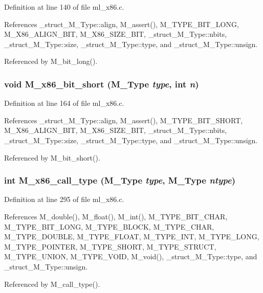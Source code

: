 Definition at line 140 of file ml\_\-x86.c.

References \_\-struct\_\-M\_\-Type::align, M\_\-assert(), M\_\-TYPE\_\-BIT\_\-LONG, M\_\-X86\_\-ALIGN\_\-BIT, M\_\-X86\_\-SIZE\_\-BIT, \_\-struct\_\-M\_\-Type::nbits, \_\-struct\_\-M\_\-Type::size, \_\-struct\_\-M\_\-Type::type, and \_\-struct\_\-M\_\-Type::unsign.

Referenced by M\_\-bit\_\-long().
\subsubsection{\setlength{\rightskip}{0pt plus 5cm}void M\_\-x86\_\-bit\_\-short (\bf{M\_\-Type} {\em type}, int {\em n})}\label{ml__x86_8c_7a8e1bb7913aaa8f58b14629c5821149}




Definition at line 164 of file ml\_\-x86.c.

References \_\-struct\_\-M\_\-Type::align, M\_\-assert(), M\_\-TYPE\_\-BIT\_\-SHORT, M\_\-X86\_\-ALIGN\_\-BIT, M\_\-X86\_\-SIZE\_\-BIT, \_\-struct\_\-M\_\-Type::nbits, \_\-struct\_\-M\_\-Type::size, \_\-struct\_\-M\_\-Type::type, and \_\-struct\_\-M\_\-Type::unsign.

Referenced by M\_\-bit\_\-short().
\subsubsection{\setlength{\rightskip}{0pt plus 5cm}int M\_\-x86\_\-call\_\-type (\bf{M\_\-Type} {\em type}, \bf{M\_\-Type} {\em ntype})}\label{ml__x86_8c_3f585d5c1788111d3cdb147a17a3fa09}




Definition at line 295 of file ml\_\-x86.c.

References M\_\-double(), M\_\-float(), M\_\-int(), M\_\-TYPE\_\-BIT\_\-CHAR, M\_\-TYPE\_\-BIT\_\-LONG, M\_\-TYPE\_\-BLOCK, M\_\-TYPE\_\-CHAR, M\_\-TYPE\_\-DOUBLE, M\_\-TYPE\_\-FLOAT, M\_\-TYPE\_\-INT, M\_\-TYPE\_\-LONG, M\_\-TYPE\_\-POINTER, M\_\-TYPE\_\-SHORT, M\_\-TYPE\_\-STRUCT, M\_\-TYPE\_\-UNION, M\_\-TYPE\_\-VOID, M\_\-void(), \_\-struct\_\-M\_\-Type::type, and \_\-struct\_\-M\_\-Type::unsign.

Referenced by M\_\-call\_\-type().
